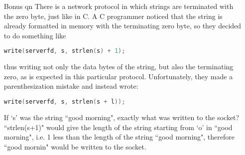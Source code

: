 \documentclass[11pt]{article}
\begin{document}
\begin{enumerate}
		\newpage
		\item[Bonus qn] 
		There is a network protocol in which strings are terminated with the zero byte, just like in C. A C programmer noticed that the string is already formatted in memory with the terminating zero byte, so they decided to do something like
		\begin{lstlisting}[language=c]
	write(serverfd, s, strlen(s) + 1);\end{lstlisting}
		thus writing not only the data bytes of the string, but also the terminating zero, as is expected in this particular protocol.
		Unfortunately, they made a parenthesization mistake and instead wrote: \begin{lstlisting}[language=c]
	write(serverfd, s, strlen(s + l));\end{lstlisting}
		If `s' was the string ``good morning", exactly what was written to the socket?\\
		
			``strlen(s+1)" would give the length of the string starting from `o' in ``good morning", i.e. 1 less than the length of the string ``good morning", therefore ``good mornin" would be written to the socket.
	\end{enumerate}
\end{document}
